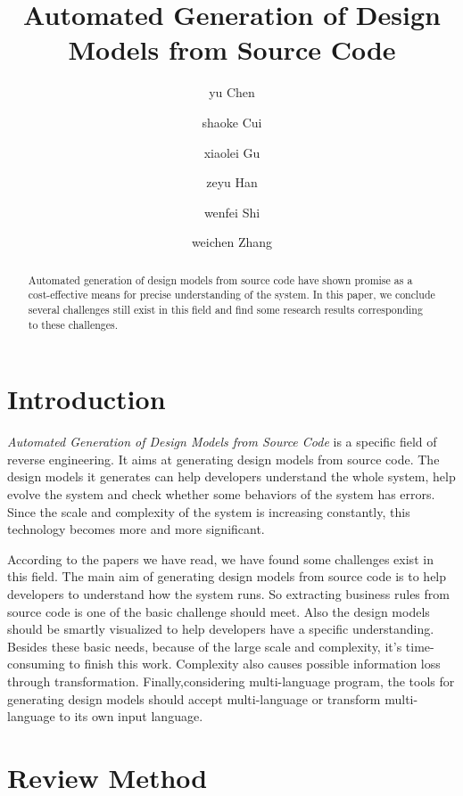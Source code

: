 \documentclass[acmsmall]{acmart}
\begin{document}
\title{Automated Generation of Design Models from Source Code}


\author{yu Chen}
\author{shaoke Cui}
\author{xiaolei Gu}
\author{zeyu Han}
\author{wenfei Shi}
\author{weichen Zhang}


\begin{abstract}
Automated generation of design models from source code have shown promise as a cost-effective means for precise understanding of the system. In this paper, we conclude several challenges still exist in this field and find some research results corresponding to these challenges.
\end{abstract}


\maketitle

\section{Introduction}
{\itshape Automated Generation of Design Models from Source Code} is a specific field of reverse engineering. It aims at generating design models from source code. The design models it generates can help developers understand the whole system, help evolve the system and check whether some behaviors of the system has errors. Since the scale and complexity of the system is increasing constantly, this technology becomes more and more significant.


According to the papers we have read, we have found some challenges exist in this field. The main aim of generating design models from source code is to help developers to understand how the system runs. So extracting business rules from source code is one of the basic challenge should meet. Also the design models should be smartly visualized to help developers have a specific understanding. Besides these basic needs, because of the large scale and complexity, it's time-consuming to finish this work. Complexity also causes possible information loss through transformation. Finally,considering multi-language program, the tools for generating design models should accept multi-language or transform multi-language to its own input language.

\section{Review Method}
\end{document}

